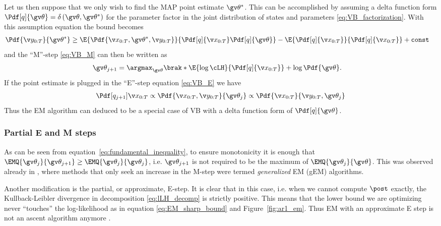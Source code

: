 Let us then suppose that we only wish to find the MAP point estimate $\Th^*$. This can be accomplished
by assuming a delta function form $\Pdf[q]{\Th}=\delta\left(\Th,\Th^*\right)$ for the parameter factor in the
joint distribution of states and parameters \eqref{eq:VB_factorization}.
With this assumption equation the bound becomes
\begin{align}
	\Pdf{\Y}{\Th^*} &\geq \E{\Pdf{\X,\Th^*,\Y}}{\Pdf[q]{\X}\Pdf[q]{\Th}} - \E{\Pdf[q]{\X}}{\Pdf[q]{\X}} + \mathtt{const}
	\label{eq:VB_MAP_boundl}
\end{align}
and the ``M''-step \eqref{eq:VB_M} can then be written as
\begin{align}
	\Th_{j+1} &= \argmax_{\Th}\brak*{\E{\log\cLH}{\Pdf[q]{\X}}+\log\Pdf{\Th}}.	
\end{align}
If the point estimate is plugged in the ``E''-step equation \eqref{eq:VB_E} we have
\begin{align}
	\Pdf[q_{j+1}]{\X}\propto \Pdf{\X,\Y}{\Th_j} \propto \Pdf{\X}{\Y,\Th_j} 	
\end{align}
Thus the EM algorithm can deduced to be a special case of VB with a delta function form
of $\Pdf[q]{\Th}$.


\subsubsection{Partial E and M steps}%
\label{sec:EM_partial}
As can be seen from equation~\eqref{eq:fundamental_inequality},
to ensure monotonicity it is enough that $\EMQ{\Th_j}{\Th_{j+1}}\geq \EMQ{\Th_{j}}{\Th_j}$,
i.e. $\Th_{j+1}$ is not required to be the maximum of $\EMQ{\Th_j}{\Th}$.
This was observed already in \textcite{Dempster1977}, where methods
that only seek an increase in the M-step were termed 
\emph{generalized} EM (gEM) algorithms. 

Another modification is the partial, or approximate, E-step. It is clear
that in this case, i.e. when we cannot compute $\post$ exactly, the Kullback-Leibler 
divergence in decomposition \eqref{eq:lLH_decomp} is strictly positive. This
means that the lower bound we are optimizing never ``touches'' the log-likelihood
as in equation \eqref{eq:EM_sharp_bound} and Figure~\ref{fig:ar1_em}. 
Thus EM with an approximate  E step is not an ascent 
algorithm anymore \parencite{Goodwin2005}.

